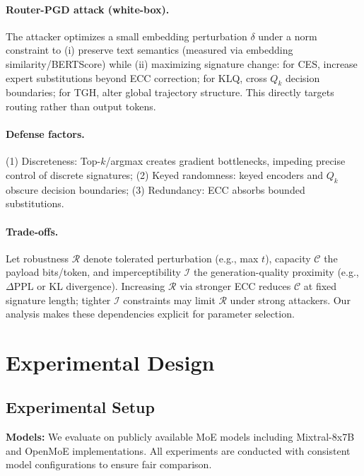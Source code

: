 \paragraph{Router-PGD attack (white-box).} The attacker optimizes a small embedding perturbation $\delta$ under a norm constraint to (i) preserve text semantics (measured via embedding similarity/BERTScore) while (ii) maximizing signature change: for CES, increase expert substitutions beyond ECC correction; for KLQ, cross $Q_k$ decision boundaries; for TGH, alter global trajectory structure. This directly targets routing rather than output tokens.

\paragraph{Defense factors.} (1) Discreteness: Top-$k$/argmax creates gradient bottlenecks, impeding precise control of discrete signatures; (2) Keyed randomness: keyed encoders and $Q_k$ obscure decision boundaries; (3) Redundancy: ECC absorbs bounded substitutions.

\paragraph{Trade-offs.} Let robustness $\mathcal{R}$ denote tolerated perturbation (e.g., max $t$), capacity $\mathcal{C}$ the payload bits/token, and imperceptibility $\mathcal{I}$ the generation-quality proximity (e.g., $\Delta$PPL or KL divergence). Increasing $\mathcal{R}$ via stronger ECC reduces $\mathcal{C}$ at fixed signature length; tighter $\mathcal{I}$ constraints may limit $\mathcal{R}$ under strong attackers. Our analysis makes these dependencies explicit for parameter selection.

\section{Experimental Design}

\subsection{Experimental Setup}

\textbf{Models:} We evaluate on publicly available MoE models including Mixtral-8x7B and OpenMoE implementations. All experiments are conducted with consistent model configurations to ensure fair comparison.

